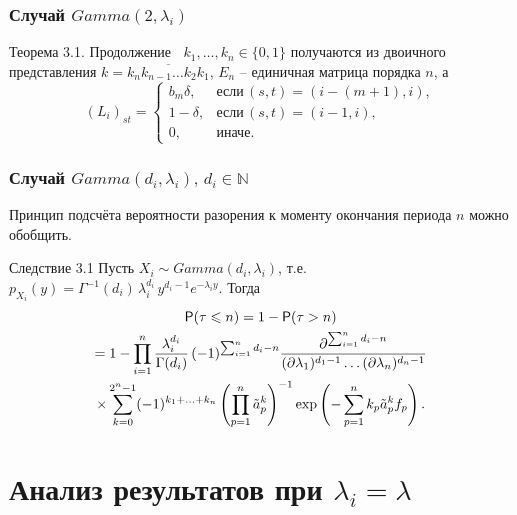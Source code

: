 \documentclass[10pt]{beamer}
\newcommand{\p}{{\sf P}}
\theoremstyle{definition}
\theoremstyle{remark}
\begin{document}
\begin{frame}\frametitle{Случай $Gamma(2,\lambda_i)$}
	\begin{block}{Теорема 3.1. Продолжение}
		$\; \; k_1, \ldots, k_n \in \lbrace 0,1 \rbrace$ получаются из двоичного представления $k = \overline{k_n k_{n-1}\ldots k_2 k_1}$, $E_n$ -- единичная матрица порядка $n$, а
		$$(L_i)_{st} = 
		\begin{cases} 
			b_m \delta,& \textit{если} \, (s,t) = (i-(m+1),i), \\ 
			1-\delta,& \textit{если} \, (s,t) = (i-1,i), \\ 
			0,& \textit{иначе}. 
		\end{cases}$$
	\end{block}
\end{frame}


\begin{frame}\frametitle{Случай $Gamma(d_i,\lambda_i),\, d_i \in \mathbb N$}
	Принцип подсчёта вероятности разорения к моменту окончания периода $n$ можно обобщить.
	\begin{block}{Следствие 3.1}
		Пусть $X_i \sim Gamma(d_i, \lambda_i)$, т.е. $p_{X_i} (y) = \Gamma^{-1}(d_i)\,\lambda_i^{d_i} \, y^{d_i-1} e^{-\lambda_i y}$. Тогда
		\begin{multline*}
			\p(\tau \leqslant n) = 1 - \p(\tau>n) \\= 1 - \prod_{i=1}^n \frac{\lambda^{d_i}_i}{ \Gamma(d_i)} \, (-1)^{\sum_{i=1}^n d_i - n}  \frac{\partial^{\sum_{i=1}^n d_i - n}}{(\partial \lambda_1)^{d_1-1} \dots (\partial \lambda_n)^{d_n-1}} \\ \times \sum_{k=0}^{2^n-1} (-1)^{k_1 + \ldots + k_n} \left( \prod_{p=1}^n \tilde a_p^k \right)^{-1} \exp \left(-\sum_{p=1}^n k_p \tilde a_p^k f_p\right).
		\end{multline*}
	\end{block}
\end{frame}
	

\section{Анализ результатов при $\lambda_i = \lambda$}
\end{document}
